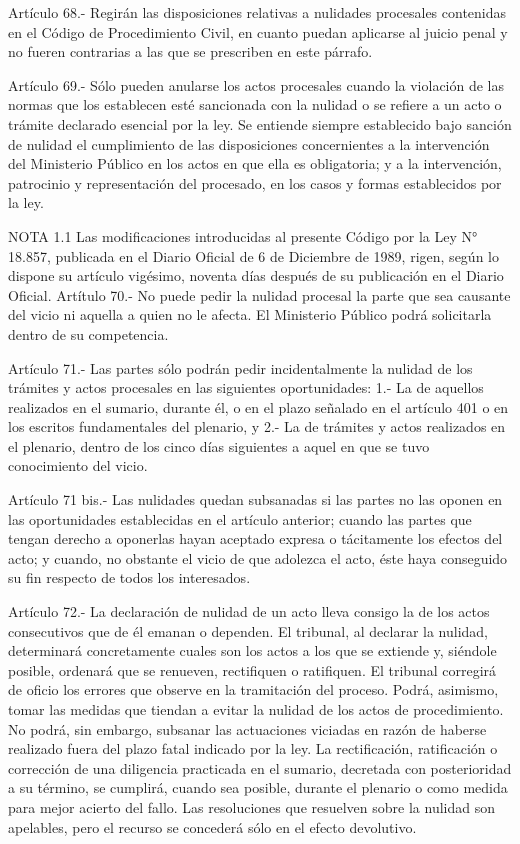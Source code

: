     Artículo 68.- Regirán las disposiciones relativas a nulidades procesales contenidas en el Código de Procedimiento Civil, en cuanto puedan aplicarse al juicio penal y no fueren contrarias a las que se prescriben en este párrafo.

    Artículo 69.- Sólo pueden anularse los actos procesales cuando la violación de las normas que los establecen esté sancionada con la nulidad o se refiere a un acto o trámite declarado esencial por la ley.
    Se entiende siempre establecido bajo sanción de nulidad el cumplimiento de las disposiciones concernientes a la intervención del Ministerio Público en los actos en que ella es obligatoria; y a la intervención, patrocinio y representación del procesado, en los casos y formas establecidos por la ley.





NOTA 1.1
    Las modificaciones introducidas al presente Código por la Ley N° 18.857, publicada en el Diario Oficial de 6 de Diciembre de 1989, rigen, según lo dispone su artículo vigésimo, noventa días después de su publicación en el Diario Oficial.
    Artítulo 70.- No puede pedir la nulidad procesal la parte que sea causante del vicio ni aquella a quien no le afecta.
      El Ministerio Público podrá solicitarla dentro de su competencia.

    Artículo 71.- Las partes sólo podrán pedir incidentalmente la nulidad de los trámites y actos procesales en las siguientes oportunidades:
      1.- La de aquellos realizados en el sumario, durante él, o en el plazo señalado en el artículo 401 o en los escritos fundamentales del plenario, y
    2.- La de trámites y actos realizados en el plenario, dentro de los cinco días siguientes a aquel en que se tuvo conocimiento del vicio.

    Artículo 71 bis.- Las nulidades quedan subsanadas si las partes no las oponen en las oportunidades establecidas en el artículo anterior; cuando las partes que tengan derecho a oponerlas hayan aceptado expresa o tácitamente los efectos del acto; y cuando, no obstante el vicio de que adolezca el acto, éste haya conseguido su fin respecto de todos los interesados.

    Artículo 72.- La declaración de nulidad de un acto lleva consigo la de los actos consecutivos que de él emanan o dependen.
      El tribunal, al declarar la nulidad, determinará concretamente cuales son los actos a los que se extiende y, siéndole posible, ordenará que se renueven, rectifiquen o ratifiquen.
    El tribunal corregirá de oficio los errores que observe en la tramitación del proceso.  Podrá, asimismo, tomar las medidas que tiendan a evitar la nulidad de los actos de procedimiento.  No podrá, sin embargo, subsanar las actuaciones viciadas en razón de haberse realizado fuera del plazo fatal indicado por la ley.
    La rectificación, ratificación o corrección de una diligencia practicada en el sumario, decretada con posterioridad a su término, se cumplirá, cuando sea posible, durante el plenario o como medida para mejor acierto del fallo.
    Las resoluciones que resuelven sobre la nulidad son apelables, pero el recurso se concederá sólo en el efecto devolutivo.

